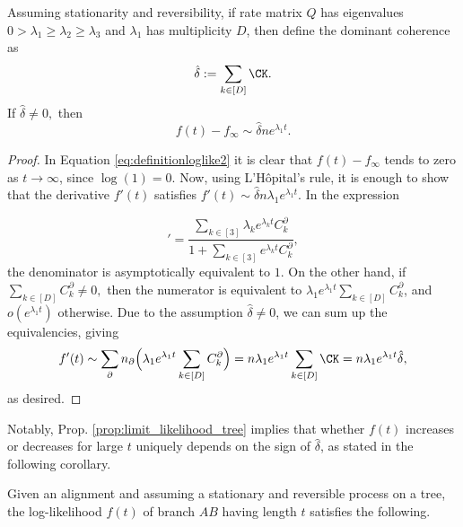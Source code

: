 \begin{appendices}
  \begin{prop} \label{prop:limit_likelihood_tree}
Assuming stationarity and reversibility, if rate matrix $Q$ has eigenvalues $0 > \lambda_1 \geq \lambda_2 \geq \lambda_3$ and $\lambda_1$ has multiplicity $D$, then define the dominant coherence as \[\hat{\delta} := \sum_{k \in [D]} \CK.\]
If $\hat{\delta} \neq 0,$ then \[f(t) - f_\infty \sim \hat{\delta} n e^{\lambda_1 t}.\]
\end{prop}
\begin{proof} \hfill
 \begin{sloppypar}
 In Equation \ref{eq:definitionloglike2} it is clear that $f(t) - f_\infty$ tends to zero as $t \to \infty$, since $\log(1) = 0$. Now, using L'H\^{o}pital's rule, it is enough to show that the derivative $f'(t)$ satisfies ${f'(t) \sim 
     \hat{\delta} n \lambda_1  e^{\lambda_1 t}}$. In the expression
 \end{sloppypar}
 \begin{equation*}
     [\log \Big(1 +  \sum_{k \in [3]} e^{\lambda_kt} C_k^\partial \Big)]' = \frac{  \sum_{k \in [3]} \lambda_k e^{\lambda_kt} C_k^\partial }{1 + \sum_{k \in [3]} e^{\lambda_kt} C_k^\partial},
 \end{equation*}
 the denominator is asymptotically equivalent to $1$. On the other hand, if ${\sum_{k \in [D]}C_k^\partial \neq 0,}$ then the numerator is equivalent to ${\lambda_1e^{\lambda_1t}\sum_{k \in [D]}C_k^\partial}$, and $o(e^{\lambda_1t})$ otherwise. Due to the assumption $\hat{\delta} \neq 0$, we can sum up the equivalencies, giving
\begin{equation}
     f'(t) \sim \sum_{\partial} n_\partial \Big(
     \lambda_1 e^{\lambda_1t}
     \sum_{k \in [D]}
     C_k^\partial 
     \Big) = 
     n \lambda_1  e^{\lambda_1 t} \sum_{k \in [D]} 
     \CK = n \lambda_1  e^{\lambda_1 t} \hat{\delta},
\end{equation}
as desired.

\end{proof}

\iffalse
Notably, Prop. \ref{prop:limit_likelihood_tree} implies that whether $f(t)$ increases or decreases for large $t$ uniquely depends on the sign of $\hat{\delta}$, as stated in the following corollary. 

\begin{cor} \label{prop:decission_tree}
\begin{sloppypar}
Given an alignment and assuming a stationary and reversible process on a tree, the log-likelihood $f(t)$ of branch $AB$ having length $t$ satisfies the following.


\end{sloppypar}
\end{cor}
\end{appendices}

